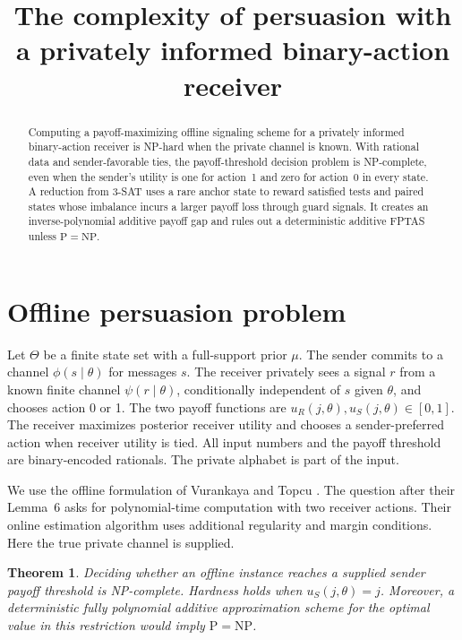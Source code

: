 \documentclass[11pt,a4paper]{amsart}
\title{The complexity of persuasion with a privately informed binary-action receiver}
\date{}
\newtheorem{theorem}{Theorem}
\begin{document}
\begin{abstract}
Computing a payoff-maximizing offline signaling scheme for a privately
informed binary-action receiver is NP-hard when the private channel is
known. With rational data and sender-favorable ties, the payoff-threshold
decision problem is NP-complete, even when the sender's utility is one
for action~1 and zero for action~0 in every state. A reduction from
3-SAT uses a rare anchor state to reward satisfied tests and paired
states whose imbalance incurs a larger payoff loss through guard
signals. It creates an inverse-polynomial additive payoff gap and rules
out a deterministic additive FPTAS unless \(\mathrm P=\mathrm{NP}\).
\end{abstract}
\maketitle

\section{Offline persuasion problem}

Let \(\Theta\) be a finite state set with a full-support prior \(\mu\).
The sender commits to a channel \(\phi(s\mid\theta)\) for messages \(s\).
The receiver privately sees a signal \(r\) from a known finite
channel \(\psi(r\mid\theta)\), conditionally independent of \(s\)
given \(\theta\), and chooses action 0 or 1. The two payoff functions
are \(u_R(j,\theta),u_S(j,\theta)\in[0,1]\). The receiver maximizes
posterior receiver utility and chooses a sender-preferred action when
receiver utility is tied. All input numbers and the payoff threshold
are binary-encoded rationals. The private alphabet is part of the input.

We use the offline formulation of Vurankaya and Topcu
\cite[eqs.~(2)--(3)]{vt}. The question after their Lemma~6 asks for
polynomial-time computation with two receiver actions. Their online
estimation algorithm uses additional regularity and margin conditions.
Here the true private channel is supplied.

\begin{theorem}
Deciding whether an offline instance reaches a supplied sender payoff
threshold is NP-complete. Hardness holds when \(u_S(j,\theta)=j\).
Moreover, a deterministic fully polynomial additive approximation scheme
for the optimal value in this restriction would imply
\(\mathrm P=\mathrm{NP}\).
\end{theorem}
\end{document}
